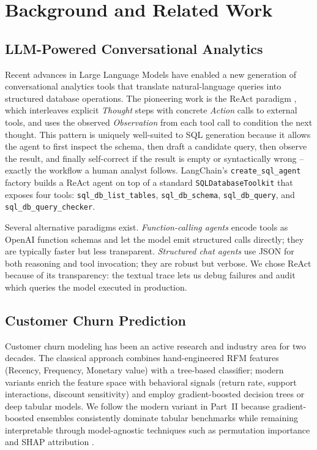 \documentclass[11pt,a4paper]{article}
\begin{document}
\section{Background and Related Work}

\subsection{LLM-Powered Conversational Analytics}

Recent advances in Large Language Models have enabled a new generation
of conversational analytics tools that translate natural-language
queries into structured database operations. The pioneering work is the
ReAct paradigm \cite{yao2022react}, which interleaves explicit
\emph{Thought} steps with concrete \emph{Action} calls to external
tools, and uses the observed \emph{Observation} from each tool call to
condition the next thought. This pattern is uniquely well-suited to SQL
generation because it allows the agent to first inspect the schema,
then draft a candidate query, then observe the result, and finally
self-correct if the result is empty or syntactically wrong --
exactly the workflow a human analyst follows. LangChain's
\texttt{create\_sql\_agent} factory builds a ReAct agent on top of a
standard \texttt{SQLDatabaseToolkit} that exposes four tools:
\texttt{sql\_db\_list\_tables}, \texttt{sql\_db\_schema},
\texttt{sql\_db\_query}, and \texttt{sql\_db\_query\_checker}.

Several alternative paradigms exist. \emph{Function-calling agents}
encode tools as OpenAI function schemas and let the model emit
structured calls directly; they are typically faster but less
transparent. \emph{Structured chat agents} use JSON for both reasoning
and tool invocation; they are robust but verbose. We chose ReAct because
of its transparency: the textual trace lets us debug failures and audit
which queries the model executed in production.

\subsection{Customer Churn Prediction}

Customer churn modeling has been an active research and industry area
for two decades. The classical approach combines hand-engineered RFM
features (Recency, Frequency, Monetary value) with a tree-based
classifier; modern variants enrich the feature space with behavioral
signals (return rate, support interactions, discount sensitivity) and
employ gradient-boosted decision trees \cite{friedman2001greedy} or
deep tabular models. We follow the modern variant in Part~II because
gradient-boosted ensembles consistently dominate tabular benchmarks
while remaining interpretable through model-agnostic techniques such
as permutation importance \cite{breiman2001random} and SHAP attribution
\cite{lundberg2017unified}.
\end{document}
